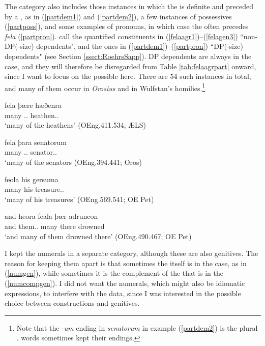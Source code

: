 \documentclass[output=paper,colorlinks,citecolor=brown]{langscibook}
\begin{document}
The  category also includes those instances in which the  is definite and preceded by a , as in (\ref{partdem1}) and (\ref{partdem2}), a few instances of possessives (\ref{partposs}), and some examples of pronouns, in which case the  often precedes \textit{fela} (\ref{partpron}). \citet[386--388]{RoehrsSapp18} call the quantified constituents in (\ref{felaagr1})–(\ref{felagen3}) “non-DP(-size) dependents", and the ones in (\ref{partdem1})--(\ref{partpron}) “DP(-size) dependents" (see Section \ref{ssect:RoehrsSapp}). DP dependents are always in the  case, and they will therefore be disregarded from Table \ref{tab:felaagrpart} onward, since I want to focus on the possible  here. There are 54 such instances in total, and many of them occur in \textit{Orosius} and in Wulfstan's homilies.\footnote{Note that the -\textit{um} ending in \textit{senatorum} in example (\ref{partdem2}) is the   plural .  words sometimes kept their  endings.}

\ea\label{partdem1}
\gll fela þære hæðenra\\
	many \DEF.\GEN.\PL{} heathen.\GEN.\PL\\
\glt ‘many of the heathens’ (OEng.411.534; ÆLS)
\z

\ea\label{partdem2}
\gll fela þara senatorum\\
many \DEF.\GEN.\PL{} senator.\GEN.\PL\\
\glt ‘many of the senators (OEng.394.441; Oros)
\z

\ea\label{partposs}
\gll feola his gersuma\\
many his treasure.\GEN.\PL\\
\glt ‘many of his treasures’ (OEng.569.541; OE Pet)
\z

\ea\label{partpron}
\gll and heora feala þær adruncon\\
and them.\GEN.\PL{} many there drowned\\
\glt ‘and many of them drowned there’ (OEng.490.467; OE Pet)
\z

I kept the numerals in a separate category, although these are also  genitives. The reason for keeping them apart is that sometimes the  itself is in the  case, as in (\ref{numgen}), while sometimes it is the complement of the  that is in the  (\ref{numcompgen}). I did not want the numerals, which might also be idiomatic expressions, to interfere with the data, since I was interested in the possible choice between  constructions and genitives.
\end{document}
